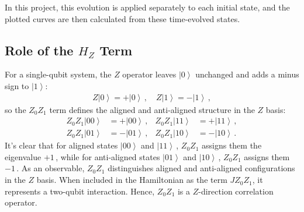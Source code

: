 \documentclass[11pt]{article}
\numberwithin{equation}{section}
\newcommand{\ket}[1]{\left| #1 \right\rangle} %
\begin{document}
In this project, this evolution is applied separately to each initial state, and the plotted curves are then calculated from these time-evolved states.

\subsection{Role of the \texorpdfstring{$H_Z$}{H\_Z} Term}
For a single-qubit system, the $Z$ operator leaves $\ket{0}$ unchanged and adds a minus sign to $\ket{1}$:
\begin{align*}
  Z\ket{0} = +\ket{0} \,, \quad Z\ket{1} = -\ket{1} \,,
\end{align*}
so the $Z_0Z_1$ term defines the aligned and anti-aligned structure in the
$Z$ basis:
\begin{align*}
  Z_0Z_1\ket{00} &= +\ket{00} \,, &
  Z_0Z_1\ket{11} &= +\ket{11} \,, \\
  Z_0Z_1\ket{01} &= -\ket{01} \,, &
  Z_0Z_1\ket{10} &= -\ket{10} \,.
\end{align*}
It's clear that for aligned states $\ket{00}$ and $\ket{11}$\,, $Z_0Z_1$ assigns them the eigenvalue $+1$\,, while for anti-aligned states $\ket{01}$ and $\ket{10}$\,, $Z_0Z_1$ assigns them $-1$\,. 
As an observable, $Z_0Z_1$ distinguishes aligned and anti-aligned configurations in the $Z$ basis. When included in the Hamiltonian as the term $JZ_0Z_1$, it represents a two-qubit interaction. Hence, $Z_0Z_1$ is a $Z$-direction correlation operator.
\end{document}
